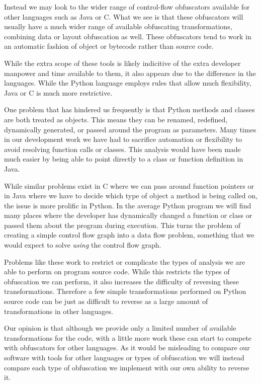 \documentclass[twoside,a4paper]{report}
\begin{document}
Instead we may look to the wider range of control-flow obfuscators available for other languages such as
Java or C. What we see is that these obfuscators will usually have a much wider range of available
obfuscating transformations, combining data or layout obfuscation as well. These obfuscators tend to
work in an automatic fashion of object or bytecode rather than source code.

While the extra scope of these tools is likely indicitive of the extra developer manpower and time
available to them, it also appears due to the difference in the languages. While the Python language
employs rules that allow much flexibility, Java or C is much more restrictive.

One problem that has hindered us frequently is that Python methods and classes are both treated as objects.
This means they can be renamed, redefined, dynamically generated, or passed around the program as parameters.
Many times in our development work we have had to sacrifice automation or flexibility to avoid resolving function
calls or classes. This analysis would have been made much easier by being able to point directly to a class or
function definition in Java.

While similar problems exist in C where we can pass around function pointers or in Java where we have to decide which
type of object a method is being called on, the issue is more prolific in Python. In the average Python program we will
find many places where the developer has dynamically changed a function or class or passed them about the program during
execution. This turns the problem of creating a simple control flow graph into a data flow problem, something that we would
expect to solve \textit{using} the control flow graph.

Problems like these work to restrict or complicate the types of analysis we are able to perform on program source code.
While this restricts the types of obfuscation we can perform, it also increases the difficulty of reversing these
transformations. Therefore a few simple transformations performed on Python source code can be just as difficult to reverse as
a large amount of transformations in other languages.

Our opinion is that although we provide only a limited number of available transformations for the code, with a little more work
these can start to compete with obfuscators for other languages. As it would be misleading to compare our software with tools for
other languages or types of obfuscation we will instead compare each type of obfuscation we implement with our own ability to reverse
it.
\end{document}
